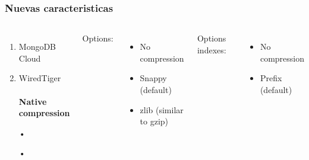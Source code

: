 \documentclass{beamer}
\begin{document}
\begin{frame}
\frametitle{Nuevas caracteristicas}
\begin{columns}[c] %

\begin{enumerate}
\item MongoDB Cloud
\item WiredTiger
\\~\\
\textbf{Native compression}
\item[•]	
\item[•]	
\end{enumerate}

Options:
\begin{itemize}
\item No compression
\item Snappy (default)
\item zlib (similar to gzip)
\end{itemize}

Options indexes:
\begin{itemize}
\item No compression
\item Prefix (default)
\end{itemize}

\end{columns}
\end{frame}
\end{document}
